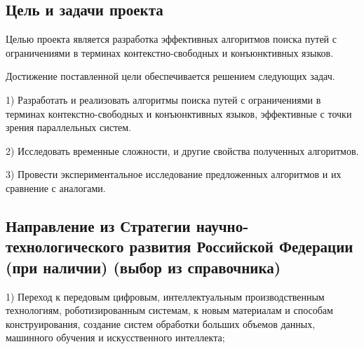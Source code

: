 \documentclass[12pt]{article}  %
\theoremstyle{remark}
\begin{document}
\subsection{Цель и задачи проекта}
Целью проекта является разработка эффективных алгоритмов поиска путей с ограничениями в терминах контекстно-свободных и конъюнктивных языков.

Достижение поставленной цели обеспечивается решением следующих задач.

1) Разработать и реализовать алгоритмы поиска путей с ограничениями в терминах контекстно-свободных и конъюнктивных языков, эффективные с точки зрения параллельных систем.

2) Исследовать временные сложности, и другие свойства полученных алгоритмов.

3) Провести экспериментальное исследование предложенных алгоритмов и их сравнение с аналогами.
\subsection{Направление из Стратегии научно-технологического развития Российской Федерации (при наличии) (выбор из справочника)}
1) Переход к передовым цифровым, интеллектуальным производственным технологиям, роботизированным системам, к новым материалам и способам конструирования, создание систем обработки больших объемов данных, машинного обучения и искусственного интеллекта;
\end{document}
